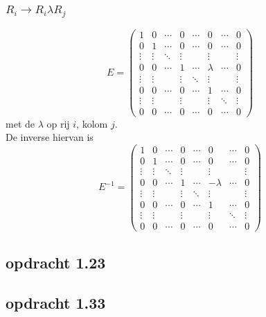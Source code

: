 \documentclass[10pt,a4paper]{article}
\begin{document}
\subsubsection*{$R_i \rightarrow R_i \lambda R_j$}
\[
E=
\begin{pmatrix}
1 & 0 & \cdots & 0 & \cdots & 0 & \cdots & 0\\
0 & 1 & \cdots & 0 & \cdots & 0 & \cdots & 0\\
\vdots & \vdots & \ddots & \vdots& & \vdots & &\vdots\\
0 & 0 & \cdots & 1 & \cdots & \lambda & \cdots & 0\\
\vdots & \vdots & & \vdots& \ddots & \vdots & &\vdots\\
0 & 0 & \cdots & 0 & \cdots & 1 & \cdots & 0\\
\vdots & \vdots & & \vdots & & \vdots & \ddots & \vdots\\
0 & 0 & \cdots & 0 & \cdots & 0 & \cdots & 0
\end{pmatrix}
\]
met de $\lambda$ op rij $i$, kolom $j$.\\
De inverse hiervan is 
\[
E^{-1}=
\begin{pmatrix}
1 & 0 & \cdots & 0 & \cdots & 0 & \cdots & 0\\
0 & 1 & \cdots & 0 & \cdots & 0 & \cdots & 0\\
\vdots & \vdots & \ddots & \vdots& & \vdots & &\vdots\\
0 & 0 & \cdots & 1 & \cdots & -\lambda & \cdots & 0\\
\vdots & \vdots & & \vdots& \ddots & \vdots & &\vdots\\
0 & 0 & \cdots & 0 & \cdots & 1 & \cdots & 0\\
\vdots & \vdots & & \vdots & & \vdots & \ddots & \vdots\\
0 & 0 & \cdots & 0 & \cdots & 0 & \cdots & 0
\end{pmatrix}
\]

\subsection*{opdracht 1.23}

\subsection*{opdracht 1.33}
\end{document}
